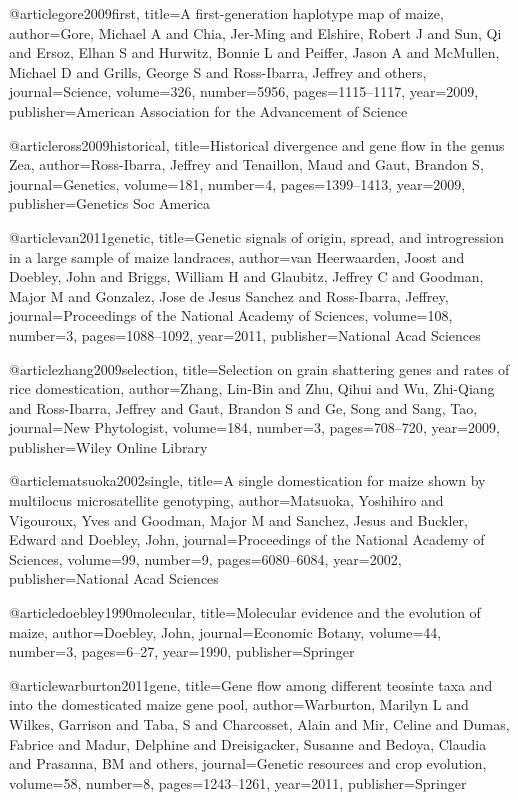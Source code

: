 @article{gore2009first,
  title={A first-generation haplotype map of maize},
  author={Gore, Michael A and Chia, Jer-Ming and Elshire, Robert J and Sun, Qi and Ersoz, Elhan S and Hurwitz, Bonnie L and Peiffer, Jason A and McMullen, Michael D and Grills, George S and Ross-Ibarra, Jeffrey and others},
  journal={Science},
  volume={326},
  number={5956},
  pages={1115--1117},
  year={2009},
  publisher={American Association for the Advancement of Science}
}

@article{ross2009historical,
  title={Historical divergence and gene flow in the genus Zea},
  author={Ross-Ibarra, Jeffrey and Tenaillon, Maud and Gaut, Brandon S},
  journal={Genetics},
  volume={181},
  number={4},
  pages={1399--1413},
  year={2009},
  publisher={Genetics Soc America}
}

@article{van2011genetic,
  title={Genetic signals of origin, spread, and introgression in a large sample of maize landraces},
  author={van Heerwaarden, Joost and Doebley, John and Briggs, William H and Glaubitz, Jeffrey C and Goodman, Major M and Gonzalez, Jose de Jesus Sanchez and Ross-Ibarra, Jeffrey},
  journal={Proceedings of the National Academy of Sciences},
  volume={108},
  number={3},
  pages={1088--1092},
  year={2011},
  publisher={National Acad Sciences}
}

@article{zhang2009selection,
  title={Selection on grain shattering genes and rates of rice domestication},
  author={Zhang, Lin-Bin and Zhu, Qihui and Wu, Zhi-Qiang and Ross-Ibarra, Jeffrey and Gaut, Brandon S and Ge, Song and Sang, Tao},
  journal={New Phytologist},
  volume={184},
  number={3},
  pages={708--720},
  year={2009},
  publisher={Wiley Online Library}
}

@article{matsuoka2002single,
  title={A single domestication for maize shown by multilocus microsatellite genotyping},
  author={Matsuoka, Yoshihiro and Vigouroux, Yves and Goodman, Major M and Sanchez, Jesus and Buckler, Edward and Doebley, John},
  journal={Proceedings of the National Academy of Sciences},
  volume={99},
  number={9},
  pages={6080--6084},
  year={2002},
  publisher={National Acad Sciences}
}

@article{doebley1990molecular,
  title={Molecular evidence and the evolution of maize},
  author={Doebley, John},
  journal={Economic Botany},
  volume={44},
  number={3},
  pages={6--27},
  year={1990},
  publisher={Springer}
}

@article{warburton2011gene,
  title={Gene flow among different teosinte taxa and into the domesticated maize gene pool},
  author={Warburton, Marilyn L and Wilkes, Garrison and Taba, S and Charcosset, Alain and Mir, Celine and Dumas, Fabrice and Madur, Delphine and Dreisigacker, Susanne and Bedoya, Claudia and Prasanna, BM and others},
  journal={Genetic resources and crop evolution},
  volume={58},
  number={8},
  pages={1243--1261},
  year={2011},
  publisher={Springer}
}

